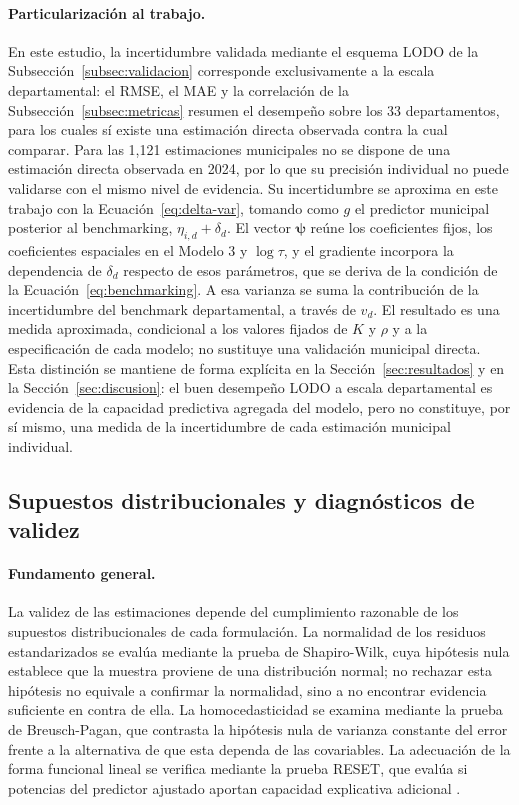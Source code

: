 \paragraph{Particularización al trabajo.}
En este estudio, la incertidumbre validada mediante el esquema LODO de la Subsección~\ref{subsec:validacion} corresponde exclusivamente a la escala departamental: el RMSE, el MAE y la correlación de la Subsección~\ref{subsec:metricas} resumen el desempeño sobre los 33 departamentos, para los cuales sí existe una estimación directa observada contra la cual comparar. Para las 1{,}121 estimaciones municipales no se dispone de una estimación directa observada en 2024, por lo que su precisión individual no puede validarse con el mismo nivel de evidencia. Su incertidumbre se aproxima en este trabajo con la Ecuación~\ref{eq:delta-var}, tomando como $g$ el predictor municipal posterior al benchmarking, $\eta_{i,d}+\delta_d$. El vector $\boldsymbol{\psi}$ reúne los coeficientes fijos, los coeficientes espaciales en el Modelo 3 y $\log\tau$, y el gradiente incorpora la dependencia de $\delta_d$ respecto de esos parámetros, que se deriva de la condición de la Ecuación~\ref{eq:benchmarking}. A esa varianza se suma la contribución de la incertidumbre del benchmark departamental, a través de $v_d$. El resultado es una medida aproximada, condicional a los valores fijados de $K$ y $\rho$ y a la especificación de cada modelo; no sustituye una validación municipal directa. Esta distinción se mantiene de forma explícita en la Sección~\ref{sec:resultados} y en la Sección~\ref{sec:discusion}: el buen desempeño LODO a escala departamental es evidencia de la capacidad predictiva agregada del modelo, pero no constituye, por sí mismo, una medida de la incertidumbre de cada estimación municipal individual.

\subsection{Supuestos distribucionales y diagnósticos de validez}
\label{subsec:diagnosticos}

\paragraph{Fundamento general.}
La validez de las estimaciones depende del cumplimiento razonable de los supuestos distribucionales de cada formulación. La normalidad de los residuos estandarizados se evalúa mediante la prueba de Shapiro-Wilk, cuya hipótesis nula establece que la muestra proviene de una distribución normal; no rechazar esta hipótesis no equivale a confirmar la normalidad, sino a no encontrar evidencia suficiente en contra de ella. La homocedasticidad se examina mediante la prueba de Breusch-Pagan, que contrasta la hipótesis nula de varianza constante del error frente a la alternativa de que esta dependa de las covariables. La adecuación de la forma funcional lineal se verifica mediante la prueba RESET, que evalúa si potencias del predictor ajustado aportan capacidad explicativa adicional \cite{Greene_2018}.

